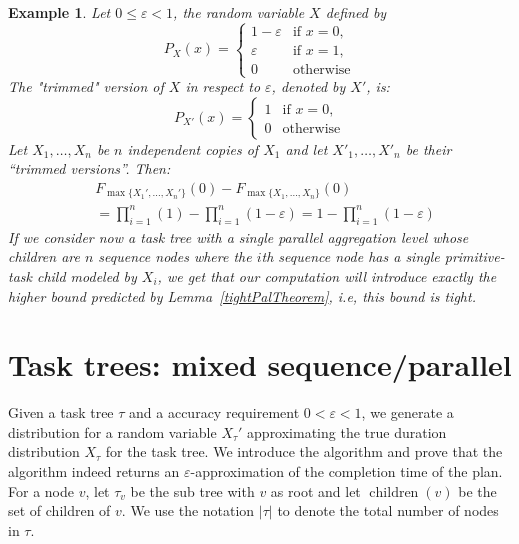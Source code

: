 \documentclass[review]{elsarticle}
\newtheorem{example}{Example}
\DeclareMathOperator{\ch}{\operatorname{children}}
\begin{document}
\begin{example}\label{expl:parallel}
Let $0 {\leq} \varepsilon {<}1$, 
the random variable $X$ defined by
$$
P_{X}(x) =\begin{cases}
1-\varepsilon  & \text{if } x=0, \\
\varepsilon     & \text{if } x=1, \\
0 & \text{otherwise}
\end{cases}
$$
The "trimmed" version of $X$ in respect to $\varepsilon$, denoted by $X'$, is:
$$
P_{X'}(x) =\begin{cases}
1  & \text{if } x=0, \\
0 & \text{otherwise}
\end{cases}
$$
Let $X_1, \dots, X_n$ be $n$ independent copies of $X_1$ and let $X'_1, \dots, X'_n$ be their ``trimmed versions''. Then:
{
\begin{align*} 
&F_{\max\{X_1',\dots, X_n'\}}( 0) - F_{\max\{X_1,\dots, X_n\}} (0)\\
&=\prod_{i=1}^n (1)-\prod_{i=1}^n (1-\varepsilon)= 1-\prod_{i=1}^n (1-\varepsilon)
\end{align*}}
If we consider now a task tree with a single parallel aggregation level whose children are $n$ 
sequence nodes where the $i$th sequence node has a single primitive-task child modeled by $X_i$, we get that our
computation will introduce exactly the higher bound predicted by Lemma~\ref{tightPalTheorem}, i.e, this bound is tight.
\end{example}

\section{Task trees: mixed sequence/parallel}\label{sec:trees}

Given a task tree $\tau$ and a accuracy requirement $0<\varepsilon<1$, we generate a distribution for a random variable $X_{\tau}'$ approximating the true duration distribution  $X_{\tau}$ for the task tree. 
We introduce the algorithm and prove that the algorithm indeed returns an $\varepsilon$-approximation of the completion time of the plan. 
For a node $v$, let $\tau_v $ be the sub tree with $v$ as root and let $\ch(v)$ be the set of children of $v$.
We use the notation $|\tau|$ to denote the total number of nodes in $\tau$.
\end{document}
